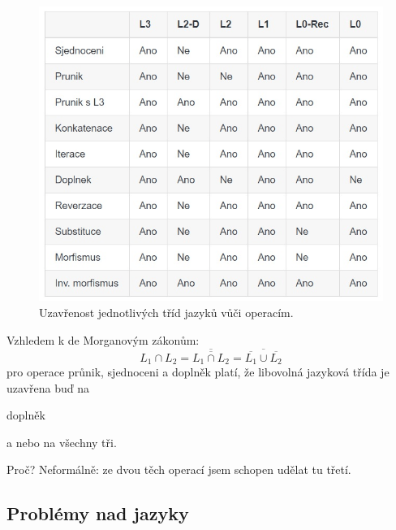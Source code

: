 \begin{figure}[H]
    \centering
    \includegraphics[width=1\linewidth]{uzavrenost_jazyku.png}
    \caption{Uzavřenost jednotlivých tříd jazyků vůči operacím.}
\end{figure}

\begin{compactitem}
    \item Vzhledem k de Morganovým zákonům: $$L_1 \cap L_2 = \overline{\overline{L_1 \cap L_2}} = \overline{\overline{L_1} \cup \overline{L_2}}$$ pro operace průnik, sjednoceni a doplněk platí, že libovolná jazyková třída je uzavřena buď na \begin{compactitem}
        \item doplněk
        \item a nebo na všechny tři.
    \end{compactitem}

    \item Proč? Neformálně: ze dvou těch operací jsem schopen udělat tu třetí.
\end{compactitem}

\subsection*{Problémy nad jazyky}

